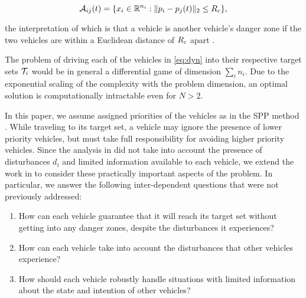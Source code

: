 \begin{equation}
\mathcal{A}_{ij}(t) = \{x_i \in \mathbb{R}^{n_i}: \|p_i - p_j(t)\|_2 \le R_c \},
\end{equation}

\noindent the interpretation of which is that a vehicle is another vehicle's danger zone if the two vehicles are within a Euclidean distance of $R_c$ apart \textcolor{blue}.

The problem of driving each of the vehicles in \eqref{eq:dyn} into their respective target sets $\mathcal{T}_i$ would be in general a differential game of dimension $\sum_i n_i$. Due to the exponential scaling of the complexity with the problem dimension, an optimal solution is computationally intractable even for $N>2$.

In this paper, we assume assigned priorities of the vehicles as in the SPP method \cite{Chen15}. While traveling to its target set, a vehicle may ignore the presence of lower priority vehicles, but must take full responsibility for avoiding higher priority vehicles. Since the analysis in \cite{Chen15} did not take into account the presence of disturbances $d_i$ and limited information available to each vehicle, we extend the work in \cite{Chen15} to consider these practically important aspects of the problem. In particular, we answer the following inter-dependent questions that were not previously addressed:

\begin{enumerate}
\item How can each vehicle guarantee that it will reach its target set without getting into any danger zones, despite the disturbances it experiences?
\item How can each vehicle take into account the disturbances that other vehicles experience?
\item How should each vehicle robustly handle situations with limited information about the state and intention of other vehicles?
\end{enumerate}